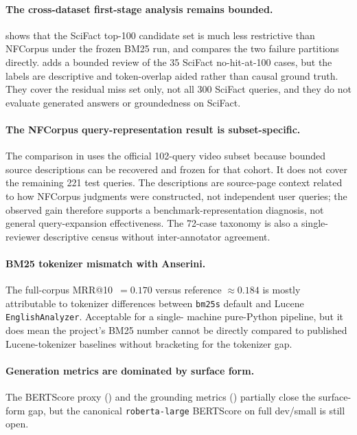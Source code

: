 \documentclass[11pt,a4paper]{article}
\makeatletter
\newcommand{\bertscore}{BERTScore}
\newcommand{\mrr}{MRR@10}
\newcommand{\bmtwofive}{BM25}
\makeatother
\begin{document}
\paragraph{The cross-dataset first-stage analysis remains bounded.}
 shows that the SciFact top-100
candidate set is much less restrictive than NFCorpus under the frozen
\bmtwofive{} run, and  compares the
two failure partitions directly.  
adds a bounded review of the 35 SciFact no-hit-at-100 cases, but the
labels are descriptive and token-overlap aided rather than causal
ground truth.  They cover the residual miss set only, not all 300
SciFact queries, and they do not evaluate generated answers or
groundedness on SciFact.

\paragraph{The NFCorpus query-representation result is subset-specific.}
The comparison in  uses the official
102-query video subset because bounded source descriptions can be
recovered and frozen for that cohort.  It does not cover the remaining
221 test queries.  The descriptions are source-page context related to
how NFCorpus judgments were constructed, not independent user queries;
the observed gain therefore supports a benchmark-representation
diagnosis, not general query-expansion effectiveness.  The 72-case
taxonomy is also a single-reviewer descriptive census without
inter-annotator agreement.

\paragraph{\bmtwofive{} tokenizer mismatch with Anserini.}  The full-corpus
\mrr{}~$=0.170$ versus reference $\approx 0.184$ is mostly
attributable to tokenizer differences between \texttt{bm25s} default
and Lucene \texttt{EnglishAnalyzer}.  Acceptable for a single-
machine pure-Python pipeline, but it does mean the project's
\bmtwofive{} number cannot be directly compared to published
Lucene-tokenizer baselines without bracketing for the tokenizer gap.

\paragraph{Generation metrics are dominated by surface form.}  The
\bertscore{} proxy () and the
grounding metrics () partially close the surface-form
gap, but the canonical \texttt{roberta-large} \bertscore{} on full
dev/small is still open.
\end{document}
